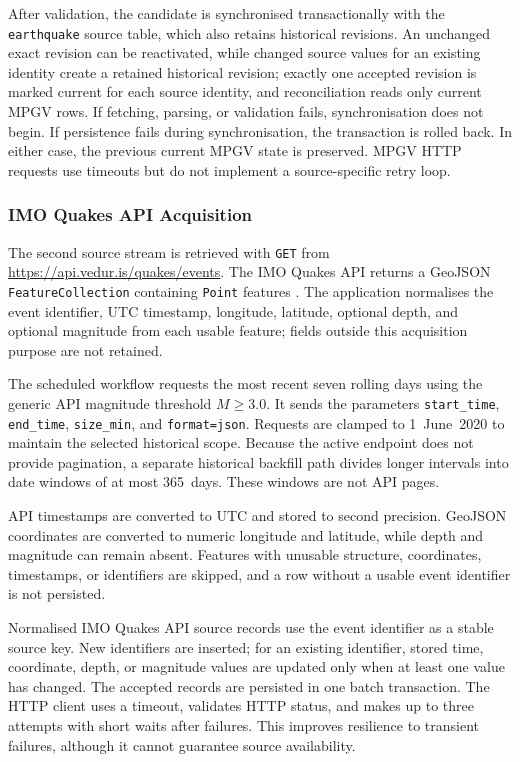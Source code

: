 \documentclass[12pt]{article}
\begin{document}
After validation, the candidate is synchronised transactionally with the \texttt{earthquake} source table, which also retains historical revisions. An unchanged exact revision can be reactivated, while changed source values for an existing identity create a retained historical revision; exactly one accepted revision is marked current for each source identity, and reconciliation reads only current MPGV rows. If fetching, parsing, or validation fails, synchronisation does not begin. If persistence fails during synchronisation, the transaction is rolled back. In either case, the previous current MPGV state is preserved. MPGV HTTP requests use timeouts but do not implement a source-specific retry loop.

\subsubsection{IMO Quakes API Acquisition}
\label{subsubsec:quakes-api-acquisition}

The second source stream is retrieved with \texttt{GET} from \url{https://api.vedur.is/quakes/events}. The IMO Quakes API returns a GeoJSON \texttt{FeatureCollection} containing \texttt{Point} features \cite{imo_quakes_api}. The application normalises the event identifier, UTC timestamp, longitude, latitude, optional depth, and optional magnitude from each usable feature; fields outside this acquisition purpose are not retained.

The scheduled workflow requests the most recent seven rolling days using the generic API magnitude threshold $M \geq 3.0$. It sends the parameters \texttt{start\_time}, \texttt{end\_time}, \texttt{size\_min}, and \texttt{format=json}. Requests are clamped to 1~June~2020 to maintain the selected historical scope. Because the active endpoint does not provide pagination, a separate historical backfill path divides longer intervals into date windows of at most 365~days. These windows are not API pages.

API timestamps are converted to UTC and stored to second precision. GeoJSON coordinates are converted to numeric longitude and latitude, while depth and magnitude can remain absent. Features with unusable structure, coordinates, timestamps, or identifiers are skipped, and a row without a usable event identifier is not persisted.

Normalised IMO Quakes API source records use the event identifier as a stable source key. New identifiers are inserted; for an existing identifier, stored time, coordinate, depth, or magnitude values are updated only when at least one value has changed. The accepted records are persisted in one batch transaction. The HTTP client uses a timeout, validates HTTP status, and makes up to three attempts with short waits after failures. This improves resilience to transient failures, although it cannot guarantee source availability.
\end{document}

